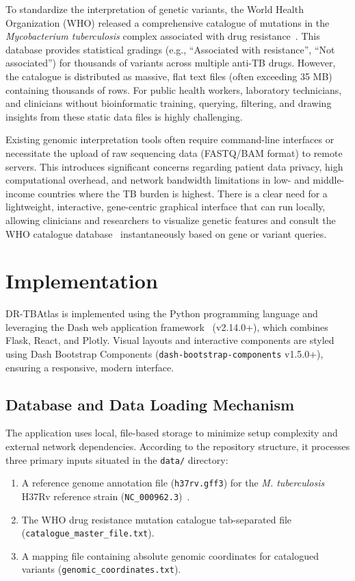 \documentclass{article}
\begin{document}
To standardize the interpretation of genetic variants, the World Health Organization (WHO) released a comprehensive catalogue of mutations in the \textit{Mycobacterium tuberculosis} complex associated with drug resistance~\cite{whocatalogue}. This database provides statistical gradings (e.g., ``Associated with resistance'', ``Not associated'') for thousands of variants across multiple anti-TB drugs. However, the catalogue is distributed as massive, flat text files (often exceeding 35 MB) containing thousands of rows. For public health workers, laboratory technicians, and clinicians without bioinformatic training, querying, filtering, and drawing insights from these static data files is highly challenging.

Existing genomic interpretation tools often require command-line interfaces or necessitate the upload of raw sequencing data (FASTQ/BAM format) to remote servers. This introduces significant concerns regarding patient data privacy, high computational overhead, and network bandwidth limitations in low- and middle-income countries where the TB burden is highest. There is a clear need for a lightweight, interactive, gene-centric graphical interface that can run locally, allowing clinicians and researchers to visualize genetic features and consult the WHO catalogue database~\cite{whocatalogue} instantaneously based on gene or variant queries.

\section{Implementation}
DR-TBAtlas is implemented using the Python programming language and leveraging the Dash web application framework~\cite{plotlydash} (v2.14.0+), which combines Flask, React, and Plotly. Visual layouts and interactive components are styled using Dash Bootstrap Components (\texttt{dash-bootstrap-components} v1.5.0+), ensuring a responsive, modern interface.

\subsection{Database and Data Loading Mechanism}
The application uses local, file-based storage to minimize setup complexity and external network dependencies. According to the repository structure, it processes three primary inputs situated in the \texttt{data/} directory:
\begin{enumerate}
    \item A reference genome annotation file (\texttt{h37rv.gff3}) for the \textit{M. tuberculosis} H37Rv reference strain (\texttt{NC\_000962.3})~\cite{refseq}.
    \item The WHO drug resistance mutation catalogue tab-separated file (\texttt{catalogue\_master\_file.txt}).
    \item A mapping file containing absolute genomic coordinates for catalogued variants (\texttt{genomic\_coordinates.txt}).
\end{enumerate}
\end{document}
